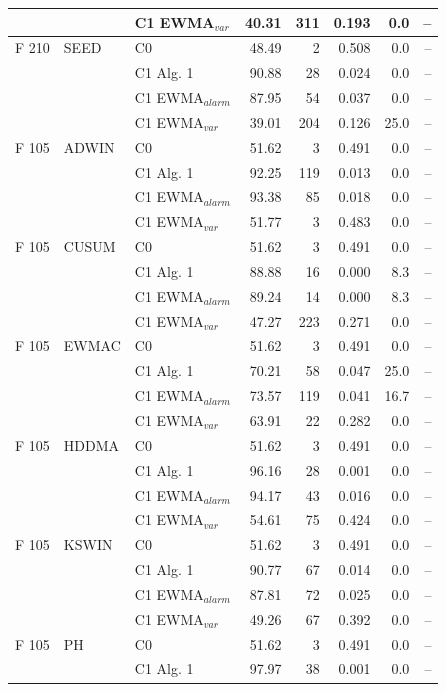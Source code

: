 \begin{longtable}{lllrrrrr}
 &  & C1 EWMA$_{var}$ & 40.31 & 311 & 0.193 & 0.0 & -- \\
\hline
F  210 & SEED & C0 & 48.49 & 2 & 0.508 & 0.0 & -- \\
 &  & C1 Alg. 1 & 90.88 & 28 & 0.024 & 0.0 & -- \\
 &  & C1 EWMA$_{alarm}$ & 87.95 & 54 & 0.037 & 0.0 & -- \\
 &  & C1 EWMA$_{var}$ & 39.01 & 204 & 0.126 & 25.0 & -- \\
\hline
F  105 & ADWIN & C0 & 51.62 & 3 & 0.491 & 0.0 & -- \\
 &  & C1 Alg. 1 & 92.25 & 119 & 0.013 & 0.0 & -- \\
 &  & C1 EWMA$_{alarm}$ & 93.38 & 85 & 0.018 & 0.0 & -- \\
 &  & C1 EWMA$_{var}$ & 51.77 & 3 & 0.483 & 0.0 & -- \\
\hline
F  105 & CUSUM & C0 & 51.62 & 3 & 0.491 & 0.0 & -- \\
 &  & C1 Alg. 1 & 88.88 & 16 & 0.000 & 8.3 & -- \\
 &  & C1 EWMA$_{alarm}$ & 89.24 & 14 & 0.000 & 8.3 & -- \\
 &  & C1 EWMA$_{var}$ & 47.27 & 223 & 0.271 & 0.0 & -- \\
\hline
F  105 & EWMAC & C0 & 51.62 & 3 & 0.491 & 0.0 & -- \\
 &  & C1 Alg. 1 & 70.21 & 58 & 0.047 & 25.0 & -- \\
 &  & C1 EWMA$_{alarm}$ & 73.57 & 119 & 0.041 & 16.7 & -- \\
 &  & C1 EWMA$_{var}$ & 63.91 & 22 & 0.282 & 0.0 & -- \\
\hline
F  105 & HDDMA & C0 & 51.62 & 3 & 0.491 & 0.0 & -- \\
 &  & C1 Alg. 1 & 96.16 & 28 & 0.001 & 0.0 & -- \\
 &  & C1 EWMA$_{alarm}$ & 94.17 & 43 & 0.016 & 0.0 & -- \\
 &  & C1 EWMA$_{var}$ & 54.61 & 75 & 0.424 & 0.0 & -- \\
\hline
F  105 & KSWIN & C0 & 51.62 & 3 & 0.491 & 0.0 & -- \\
 &  & C1 Alg. 1 & 90.77 & 67 & 0.014 & 0.0 & -- \\
 &  & C1 EWMA$_{alarm}$ & 87.81 & 72 & 0.025 & 0.0 & -- \\
 &  & C1 EWMA$_{var}$ & 49.26 & 67 & 0.392 & 0.0 & -- \\
\hline
F  105 & PH & C0 & 51.62 & 3 & 0.491 & 0.0 & -- \\
 &  & C1 Alg. 1 & 97.97 & 38 & 0.001 & 0.0 & -- \\

\end{longtable}
